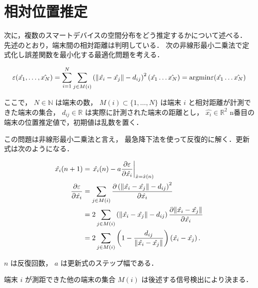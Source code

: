 

\section{相対位置推定}


次に，複数のスマートデバイスの空間分布をどう推定するかについて述べる．
先述のとおり，端末間の相対距離は判明している．
次の非線形最小二乗法で定式化し誤差関数を最小化する最適化問題を考える．

$$
\varepsilon(\hat{x_1}, \dots, \hat{x_N}) = \sum_{i=1}^N \sum_{j\in M(i)} \left( \| \hat{ x_i } - \hat{ x_j } \| - d_{ij} \right)^2 \\
(\hat{x_1} \dots \hat{x_N}) = \mathrm{argmin} \varepsilon(\hat{x_1} \dots \hat{x_N})
$$

ここで，
$N \in \mathbb{N}$ は端末の数，
$M(i) \subset \{1,\dots,N\}$ は端末 $i$ と相対距離が計測できた端末の集合，
$d_{ij} \in \mathbb{R}$ は実際に計測された端末の距離とし，
$\hat{ x_i } \in \mathbb{R}^2$ n番目の端末の位置推定値で，初期値は乱数を置く．

この問題は非線形最小二乗法と言え，
最急降下法を使って反復的に解く．更新式は次のようになる．

$$\begin{aligned}
\hat{x_i} (n + 1) & = \left. \hat{x_i} (n) - a \frac{\partial \varepsilon}{\partial \hat{x_i}} \right|_{\hat{x} = \hat{x}(n)} \\
\frac{\partial \varepsilon}{\partial \hat{x_i}}
&= \sum_{j\in M(i)} \frac{\partial \left( \|\hat{ x_i } - \hat{ x_j }\| - d_{ij} \right)^2}{\partial \hat{x_i}} \notag\\
&= 2 \sum_{j\in M(i)} \left( \| \hat{x_i} - \hat{x_j} \| - d_{ij} \right) \frac{\partial \| \hat{x_i} - \hat{x_j} \|}{\partial \hat{x_i}} \notag\\
&= 2 \sum_{j\in M(i)} \left( 1 - \frac{d_{ij}}{\| \hat{x_i} - \hat{x_j} \|} \right) \left( \hat{x_i} - \hat{x_j} \right).
\end{aligned}$$

$n$ は反復回数， $a$ は更新式のステップ幅である．

端末 $i$ が測距できた他の端末の集合 $M(i)$ は後述する信号検出により決まる．
